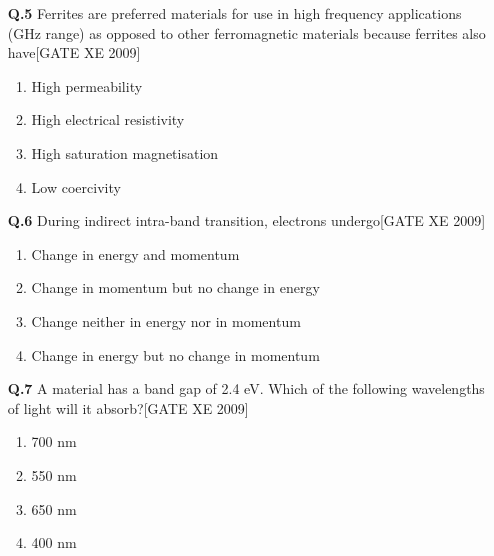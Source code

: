 \documentclass[journal,12pt,onecolumn]{IEEEtran}
\theoremstyle{remark}
\begin{document}
\begin{enumerate}
\begin{enumerate}
\vspace{0.3cm}

\item[\textbf{Q.5}] Ferrites are preferred materials for use in high frequency applications (GHz range) as opposed to other ferromagnetic materials because ferrites also have\hfill[GATE XE 2009]

\begin{multicols}{2}
\begin{enumerate}
    \item High permeability
    \item High electrical resistivity
    \item High saturation magnetisation
    \item Low coercivity
\end{enumerate}
\end{multicols}

\vspace{0.3cm}

\item[\textbf{Q.6}] During indirect intra-band transition, electrons undergo\hfill[GATE XE 2009]

\begin{multicols}{2}
\begin{enumerate}
    \item Change in energy and momentum
    \item Change in momentum but no change in energy
    \item Change neither in energy nor in momentum
    \item Change in energy but no change in momentum
\end{enumerate}
\end{multicols}

\vspace{0.3cm}

\item[\textbf{Q.7}] A material has a band gap of 2.4 eV. Which of the following wavelengths of light will it absorb?\hfill[GATE XE 2009]

\begin{multicols}{2}
\begin{enumerate}
    \item 700 nm
    \item 550 nm
    \item 650 nm
    \item 400 nm
\end{enumerate}
\end{multicols}


\end{enumerate}
\end{enumerate}
\end{document}
